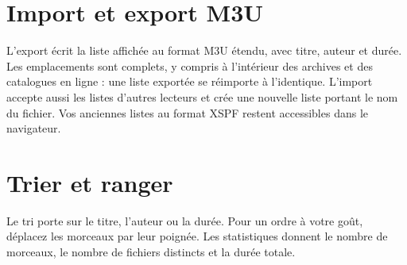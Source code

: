 \section{Import et export M3U}
L'export écrit la liste affichée au format M3U étendu, avec titre, auteur et durée. Les emplacements sont complets,
y compris à l'intérieur des archives et des catalogues en ligne : une liste exportée se réimporte à l'identique.
L'import accepte aussi les listes d'autres lecteurs et crée une nouvelle liste portant le nom du fichier. Vos
anciennes listes au format XSPF restent accessibles dans le navigateur.

\section{Trier et ranger}
Le tri porte sur le titre, l'auteur ou la durée. Pour un ordre à votre goût, déplacez les morceaux par leur poignée.
Les statistiques donnent le nombre de morceaux, le nombre de fichiers distincts et la durée totale.
